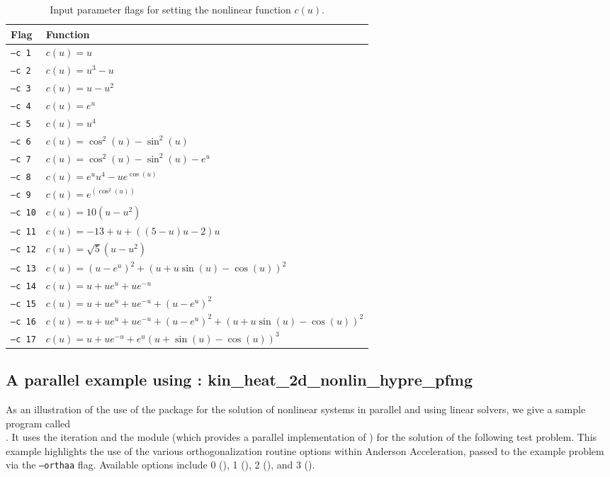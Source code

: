 \begin{table}
\begin{center}
\caption{Input parameter flags for setting the nonlinear function $c(u)$.}
\begin{tabular}{ |p{2cm}|p{10cm}| }
\hline
Flag & Function \\
\hline
{\tt --c 1} & $ c(u) = u $ \\
{\tt --c 2} & $ c(u) = u^3 - u $ \\
{\tt --c 3} & $ c(u) = u - u^2 $ \\
{\tt --c 4} & $ c(u) = e^u $ \\
{\tt --c 5} & $ c(u) = u^4 $ \\
{\tt --c 6} & $ c(u) = \cos^2(u) - \sin^2(u) $ \\
{\tt --c 7} & $ c(u) = \cos^2(u) - \sin^2(u) - e^u $ \\
{\tt --c 8} & $ c(u) = e^uu^4 - ue^{\cos(u)} $ \\
{\tt --c 9} & $ c(u) = e^{(\cos^2(u))} $ \\
{\tt --c 10} & $ c(u) = 10(u - u^2) $ \\
{\tt --c 11} & $ c(u) = -13 + u + ((5-u)u - 2)u $ \\
{\tt --c 12} & $ c(u) = \sqrt{5}(u - u^2) $ \\
{\tt --c 13} & $ c(u) = (u - e^u)^2 + (u + u \sin(u) - \cos(u))^2 $ \\
{\tt --c 14} & $ c(u) = u + ue^u + ue^{-u} $ \\
{\tt --c 15} & $ c(u) = u + ue^u + ue^{-u} + (u - e^u)^2 $ \\
{\tt --c 16} & $ c(u) = u + ue^u + ue^{-u} + (u - e^u)^2 + (u + u\sin(u) - \cos(u))^2 $ \\
{\tt --c 17} & $ c(u) = u + ue^{-u} + e^u (u + \sin(u) - \cos(u))^3 $ \\
\hline
\end{tabular}
\end{center}
\end{table}

\subsection{A parallel example using {\hypre}: kin\_heat\_2d\_nonlin\_hypre\_pfmg}
\label{ss:kin_heat_2d_nonlin_hypre_pfmg}

As an illustration of the use of the {\kinsol} package for the solution of
nonlinear systems in parallel and using {\hypre} linear solvers, we give a
sample program called \\ .  It uses the
{\kinsol}  iteration and the {\nvecp} module (which provides a
parallel implementation of {\nvector}) for the solution of the following test
problem.  This example highlights the use of the various orthogonalization
routine options within Anderson Acceleration, passed to the example problem via
the \texttt{--orthaa} flag. Available options include 0 (), 1
(), 2 (), and 3 ().


